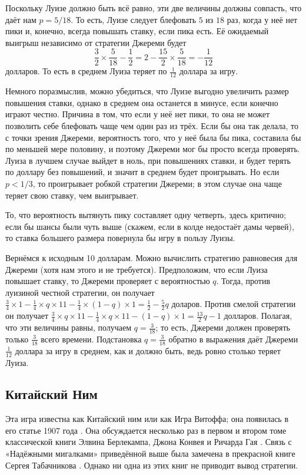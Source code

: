 Поскольку Луизе должно быть всё равно, эти две величины должны совпасть, что даёт нам $p = 5/18$.
То есть, Луизе следует блефовать $5$ из $18$ раз, когда у неё нет пики и, конечно, всегда повышать ставку, если пика есть.
Её ожидаемый выигрыш независимо от стратегии Джереми будет
\[\frac32\times\frac5{18}-\frac12=2-\frac{15}2\times\frac5{18}=-\frac1{12}\]
долларов.
То есть в среднем Луиза теряет по $\tfrac1{12}$ доллара за игру.

Немного поразмыслив, можно убедиться, что Луизе выгодно увеличить размер повышения ставки,
однако в среднем она останется в минусе, если конечно играют честно.
Причина в том, что если у неё нет пики, то она не может позволить себе блефовать чаще чем один раз из трёх.
Если бы она так делала, то с точки зрения Джереми, вероятность того, что у неё была бы пика, составила бы по меньшей мере половину, и поэтому Джереми мог бы просто всегда проверять.
Луиза в лучшем случае выйдет в ноль, при повышениях ставки, и будет терять по доллару без повышений, и значит в среднем будет проигрывать.
Но если $p < 1/3$, то проигрывает робкой стратегии Джереми;
в этом случае она чаще теряет свою ставку, чем выигрывает.

То, что вероятность вытянуть пику составляет одну четверть, здесь критично; если бы шансы были чуть выше (скажем, если в колде недостаёт дамы червей), то ставка большего размера повернула бы игру в пользу Луизы.

Вернёмся к исходным 10 долларам.
Можно вычислить стратегию равновесия для Джереми (хотя нам этого и не требуется).
Предположим, что если Луиза повышает ставку, то Джереми проверяет с вероятностью $q$.
Тогда, против луизиной честной стратегии, он получает $\tfrac34 \times 1 - \tfrac14 \times q \times 11 - \tfrac14 \times (1 - q) \times 1 = \tfrac12 - \tfrac52q$ доларов.
Против смелой стратегии он получает $\tfrac34 \times q \times 11 - \tfrac14 \times q \times 11 - (1 - q) \times 1 = \tfrac{13}2q - 1$ долларов.
Полагая, что эти величины равны, получаем $q = \tfrac3{18}$; то есть, Джереми должен проверять только $\tfrac3{18}$ всего времени.
Подстановка $q = \tfrac3{18}$ обратно в выражения даёт Джереми $\tfrac1{12}$ доллара за игру в среднем, как и должно быть, ведь ровно столько теряет Луиза.

\subsection*{Китайский Ним}

Эта игра известна как Китайский ним или как Игра Витоффа;
она появилась в его статье 1907 года \cite{wythoff}.
Она обсуждается несколько раз в первом и втором томе классической книги Элвина Берлекампа, Джона Конвея и Ричарда  Гая \cite{berlekamp-conway-guy}.
Связь с «Надёжными мигалками» приведённой выше была замечена в прекрасной книге Сергея Табачникова \cite{tabachnikov}.
Однако ни одна из этих книг не приводит вывод стратегии.

